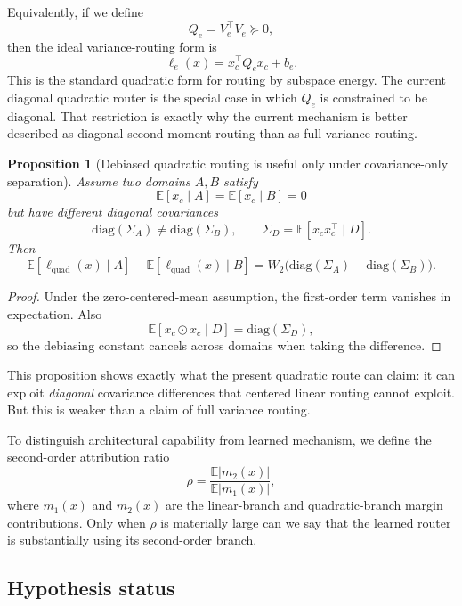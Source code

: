 \documentclass[11pt]{article}
\newtheorem{proposition}{Proposition}
\begin{document}
Equivalently, if we define
\[
Q_e = V_e^{\top}V_e \succeq 0,
\]
then the ideal variance-routing form is
\[
\ell_e(x)=x_c^{\top}Q_e x_c + b_e.
\]
This is the standard quadratic form for routing by subspace energy. The current diagonal quadratic router is the special case in which $Q_e$ is constrained to be diagonal. That restriction is exactly why the current mechanism is better described as diagonal second-moment routing than as full variance routing.

\begin{proposition}[Debiased quadratic routing is useful only under covariance-only separation]
Assume two domains $A,B$ satisfy
\[
\mathbb{E}[x_c\mid A]=\mathbb{E}[x_c\mid B]=0
\]
but have different diagonal covariances
\[
\mathrm{diag}(\Sigma_A)\neq \mathrm{diag}(\Sigma_B),
\qquad
\Sigma_D=\mathbb{E}[x_cx_c^\top\mid D].
\]
Then
\[
\mathbb{E}[\ell_{\mathrm{quad}}(x)\mid A]-\mathbb{E}[\ell_{\mathrm{quad}}(x)\mid B]
=
W_2\big(\mathrm{diag}(\Sigma_A)-\mathrm{diag}(\Sigma_B)\big).
\]
\end{proposition}

\begin{proof}
Under the zero-centered-mean assumption, the first-order term vanishes in expectation. Also
\[
\mathbb{E}[x_c\odot x_c\mid D]=\mathrm{diag}(\Sigma_D),
\]
so the debiasing constant cancels across domains when taking the difference.
\end{proof}

This proposition shows exactly what the present quadratic route can claim: it can exploit \emph{diagonal} covariance differences that centered linear routing cannot exploit. But this is weaker than a claim of full variance routing.

To distinguish architectural capability from learned mechanism, we define the second-order attribution ratio
\[
\rho
=
\frac{\mathbb{E}|m_2(x)|}{\mathbb{E}|m_1(x)|},
\]
where $m_1(x)$ and $m_2(x)$ are the linear-branch and quadratic-branch margin contributions. Only when $\rho$ is materially large can we say that the learned router is substantially using its second-order branch.

\subsection{Hypothesis status}
\end{document}

